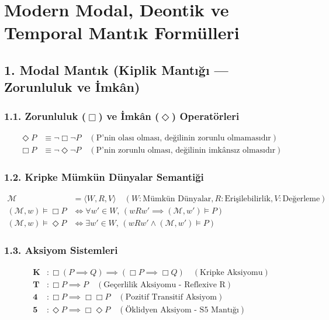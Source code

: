 \documentclass[11pt, a4paper]{article}
\begin{document}
\section{Modern Modal, Deontik ve Temporal Mantık Formülleri}

\subsection{1. Modal Mantık (Kiplik Mantığı --- Zorunluluk ve İmkân)}

\subsubsection{1.1. Zorunluluk ($\Box$) ve İmkân ($\Diamond$) Operatörleri}
\begin{align}
\Diamond P &\equiv \neg \Box \neg P \quad (\text{P'nin olası olması, değilinin zorunlu olmamasıdır}) \\
\Box P &\equiv \neg \Diamond \neg P \quad (\text{P'nin zorunlu olması, değilinin imkânsız olmasıdır})
\end{align}

\subsubsection{1.2. Kripke Mümkün Dünyalar Semantiği}
\begin{align}
\mathcal{M} &= \langle W, R, V \rangle \quad (W: \text{Mümkün Dünyalar}, R: \text{Erişilebilirlik}, V: \text{Değerleme}) \\
(\mathcal{M}, w) \models \Box P &\iff \forall w' \in W, \, (w R w' \implies (\mathcal{M}, w') \models P) \\
(\mathcal{M}, w) \models \Diamond P &\iff \exists w' \in W, \, (w R w' \land (\mathcal{M}, w') \models P)
\end{align}

\subsubsection{1.3. Aksiyom Sistemleri}
\begin{align}
\mathbf{K} &: \Box(P \implies Q) \implies (\Box P \implies \Box Q) \quad (\text{Kripke Aksiyomu}) \\
\mathbf{T} &: \Box P \implies P \quad (\text{Geçerlilik Aksiyomu - Reflexive R}) \\
\mathbf{4} &: \Box P \implies \Box \Box P \quad (\text{Pozitif Transitif Aksiyom}) \\
\mathbf{5} &: \Diamond P \implies \Box \Diamond P \quad (\text{Öklidyen Aksiyom - S5 Mantığı})
\end{align}
\end{document}
